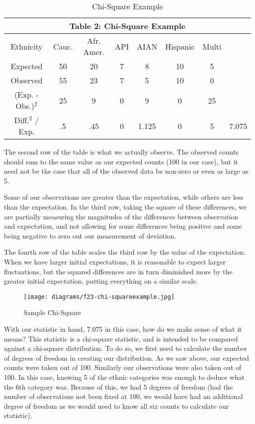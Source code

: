 \begin{table}
\centering
 \begin{tabular}{|c c c c c c c c|}
  \multicolumn{8}{c}{Table 2: Chi-Square Example} \\
 \hline
  Ethnicity & Cauc. & Afr. Amer. & API & AIAN &Hispanic & Multi&\\ [0.5ex] 
 \hline
 Expected &50 &20 &7 &8 &10 &5&  \\ 
 \hline
  Observed &55 &23 &7 &5 &10 &0&  \\ 
 \hline
 (Exp. - Obs.)$^2$ &25 &9 &0 &9 &0 &25&  \\
 \hline
 Diff.$^2$ / Exp. &.5 &.45 &0 &1.125 &0 &5 &7.075  \\
 \hline
\end{tabular}
\caption{Chi-Square Example}
\label{tab:table2}
\end{table}

\par The second row of the table is what we actually observe.  The observed counts should sum to the same value as our expected counts (100 in our case), but it need not be the case that all of the observed data be non-zero or even as large as 5.

\par Some of our observations are greater than the expectation, while others are less than the expectation.  In the third row, taking the square of these differences, we are partially measuring the magnitudes of the differences between observation and expectation, and not allowing for some differences being positive and some being negative to zero out our measurement of deviation.

\par The fourth row of the table scales the third row by the value of the expectation.  When we have larger initial expectations, it is reasonable to expect larger fluctuations, but the squared differences are in turn diminished more by the greater initial expectation, putting everything on a similar scale.

\begin{wrapfigure}{r}{2in}
\texttt{[image: diagrams/f23-chi-squareexample.jpg]}
\caption{Sample Chi-Square}
\label{fig:figure23}
\end{wrapfigure}

\par With our statistic in hand, 7.075 in this case, how do we make sense of what it means?  This statistic is a chi-square statistic, and is intended to be compared against a chi-square distribution.  To do so, we first need to calculate the number of degrees of freedom in creating our distribution.  As we saw above, our expected counts were taken out of 100.  Similarly our observations were also taken out of 100.  In this case, knowing 5 of the ethnic categories was enough to deduce what the 6th category was.  Because of this, we had 5 degrees of freedom (had the number of observations not been fixed at 100, we would have had an additional degree of freedom as we would need to know all six counts to calculate our statistic).

